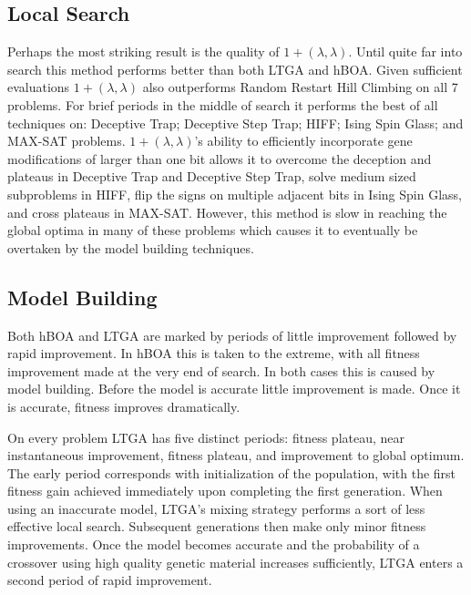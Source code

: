 \documentclass[twoside]{article}
\begin{document}
\subsection{Local Search}
Perhaps the most striking result is the quality of $1+(\lambda, \lambda)$. Until quite far into search this
method performs better than both LTGA and hBOA. Given sufficient evaluations $1+(\lambda, \lambda)$ also outperforms
Random Restart Hill Climbing on all 7 problems. For brief periods in the middle of search it performs the
best of all techniques on: Deceptive Trap; Deceptive Step Trap; HIFF; Ising Spin Glass; and MAX-SAT problems.
$1+(\lambda, \lambda)$'s ability to efficiently incorporate gene modifications of larger
than one bit allows it to overcome the deception and plateaus in Deceptive Trap and Deceptive Step Trap, solve medium sized subproblems
in HIFF, flip the signs on multiple adjacent bits in Ising Spin Glass, and cross plateaus in MAX-SAT. However,
this method is slow in reaching the global optima in many of these problems which causes it to eventually
be overtaken by the model building techniques.

\subsection{Model Building}
Both hBOA and LTGA are marked by periods of little improvement followed by rapid improvement.
In hBOA this is taken to the extreme, with all fitness
improvement made at the very end of search. In both cases this is caused by model building. Before the model
is accurate little improvement is made. Once it is accurate, fitness improves dramatically.

On every problem LTGA has five distinct periods: fitness plateau, near instantaneous improvement, fitness plateau,
and improvement to global optimum. The early period corresponds with
initialization of the population, with the first fitness gain achieved immediately upon completing the first generation.
When using an inaccurate model, LTGA's mixing strategy performs a sort of less effective local search.
Subsequent generations then make only minor fitness improvements. Once the model
becomes accurate and the probability of a crossover using high quality genetic material increases sufficiently, LTGA
enters a second period of rapid improvement.

\begin{comment}
This behavior is easiest to understand on the two Trap problems. LTGA's first generation will push individual traps toward a
local optima, but it requires more than a single generation to do so completely. Until that occurs, the model is likely behaving
no better than random as there is little apparent linkage between bits. Once the model begins to identify individual traps, crossover
can begin to increase the frequency of higher fitness trap settings. This process begins slowly as low fitness local optima are more
likely to be chosen for donation than high fitness local optima due to their frequency in the population. The process becomes
self-catalysing as increased frequency of the global optimum trap genes means increased likelihood of the global optimum being spread by crossover.
\end{comment}
\end{document}
